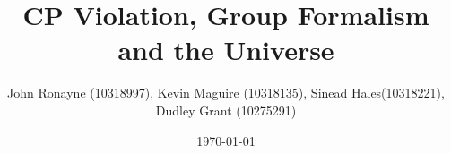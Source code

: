\documentclass[floatfix,aps,prd,amsmath,amssymb]{revtex4}
\begin{document}
\title{CP Violation, Group Formalism and the Universe}
\author{John Ronayne (10318997), Kevin Maguire (10318135), Sinead Hales(10318221), Dudley Grant (10275291)}
\date{\today}

\begin{abstract}
\textit{}
\end{abstract}

\maketitle
\tableofcontents
{}


 















\end{document}
